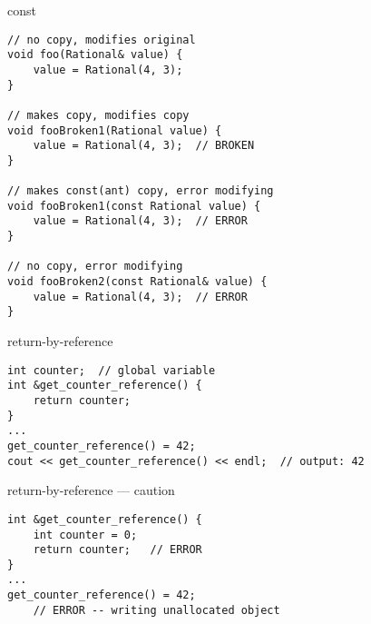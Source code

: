 \begin{frame}[fragile,label=constReferneces]{const}
\lstset{
    language=C++,
    style=smaller,
}
    \vspace{-.75cm}
\begin{lstlisting}
// no copy, modifies original 
void foo(Rational& value) { 
    value = Rational(4, 3);
}

// makes copy, modifies copy
void fooBroken1(Rational value) {  
    value = Rational(4, 3);  // BROKEN
}

// makes const(ant) copy, error modifying
void fooBroken1(const Rational value) { 
    value = Rational(4, 3);  // ERROR
}

// no copy, error modifying
void fooBroken2(const Rational& value) {
    value = Rational(4, 3);  // ERROR
}
\end{lstlisting}
\end{frame}

\begin{frame}[fragile,label=returnByRef]{return-by-reference}
\lstset{language=C++,style=small}
\begin{lstlisting}
int counter;  // global variable
int &get_counter_reference() {
    return counter;
}
...
get_counter_reference() = 42;
cout << get_counter_reference() << endl;  // output: 42
\end{lstlisting}
\end{frame}

\begin{frame}[fragile,label=returnByRefCaution]{return-by-reference --- caution}
\lstset{language=C++,style=small}
\begin{lstlisting}
int &get_counter_reference() {
    int counter = 0;
    return counter;   // ERROR
}
...
get_counter_reference() = 42; 
    // ERROR -- writing unallocated object
\end{lstlisting}
\end{frame}
